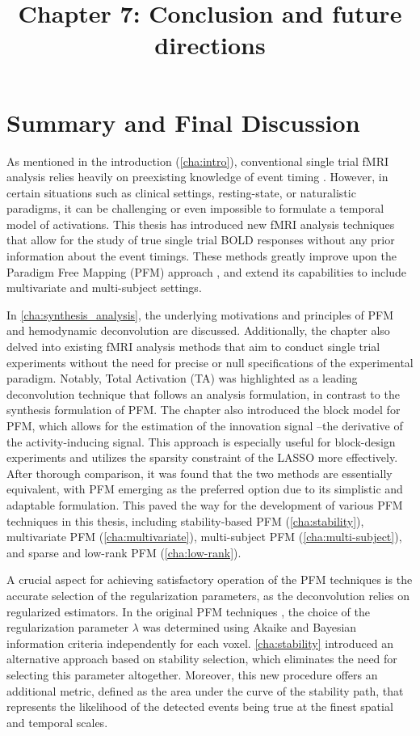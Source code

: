 \title{Chapter 7: Conclusion and future directions}
\label{cha:conclusion}

\section{Summary and Final Discussion}

As mentioned in the introduction (\cref{cha:intro}), conventional single trial
fMRI analysis relies heavily on preexisting knowledge of event timing
\citep{Buckner1996Detectioncorticalactivation,Menon1998Mentalchronometryusing,Richter1997TimeresolvedfMRI}.
However, in certain situations such as clinical settings, resting-state, or
naturalistic paradigms, it can be challenging or even impossible to formulate a
temporal model of activations. This thesis has introduced new fMRI analysis
techniques that allow for the study of true single trial BOLD responses without
any prior information about the event timings. These methods greatly improve
upon the Paradigm Free Mapping (PFM) approach \citep{Gaudes2013Paradigmfreemapping}, and
extend its capabilities to include multivariate and multi-subject settings.

In \cref{cha:synthesis_analysis}, the underlying motivations and principles of
PFM and hemodynamic deconvolution are discussed. Additionally, the chapter also
delved into existing fMRI analysis methods that aim to conduct single trial
experiments without the need for precise or null specifications of the
experimental paradigm. Notably, Total Activation (TA) was highlighted as a leading
deconvolution technique that follows an analysis formulation, in contrast to the
synthesis formulation of PFM. The chapter also introduced the block model for
PFM, which allows for the estimation of the innovation signal --the derivative
of the activity-inducing signal. This approach is especially useful for
block-design experiments and utilizes the sparsity constraint of the LASSO more
effectively. After thorough comparison, it was found that the two methods are
essentially equivalent, with PFM emerging as the preferred option due to its
simplistic and adaptable formulation. This paved the way for the development of
various PFM techniques in this thesis, including stability-based PFM
(\cref{cha:stability}), multivariate PFM (\cref{cha:multivariate}),
multi-subject PFM (\cref{cha:multi-subject}), and sparse and low-rank PFM
(\cref{cha:low-rank}).

A crucial aspect for achieving satisfactory operation of the PFM techniques is
the accurate selection of the regularization parameters, as the deconvolution
relies on regularized estimators. In the original PFM techniques
\citep{Gaudes2013Paradigmfreemapping}, the choice of the regularization
parameter $\lambda$ was determined using Akaike and Bayesian information
criteria independently for each voxel. \cref{cha:stability} introduced an
alternative approach based on stability selection, which eliminates the need for
selecting this parameter altogether. Moreover, this new procedure offers an
additional metric, defined as the area under the curve of the stability path,
that represents the likelihood of the detected events being true at the finest
spatial and temporal scales.

